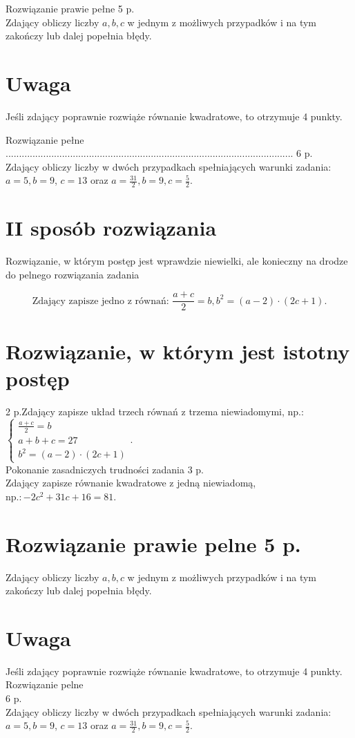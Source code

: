 \documentclass[10pt]{article}
\begin{document}
Rozwiązanie prawie pełne 5 p.\\
Zdający obliczy liczby $a, b, c$ w jednym z możliwych przypadków i na tym zakończy lub dalej popełnia błędy.

\section*{Uwaga}
Jeśli zdający poprawnie rozwiąże równanie kwadratowe, to otrzymuje 4 punkty.

Rozwiązanie pełne ........................................................................................................... 6 p.\\
Zdający obliczy liczby w dwóch przypadkach spełniających warunki zadania: $a=5, b=9$, $c=13$ oraz $a=\frac{31}{2}, b=9, c=\frac{5}{2}$.

\section*{II sposób rozwiązania}
Rozwiązanie, w którym postęp jest wprawdzie niewielki, ale konieczny na drodze do pelnego rozwiązania zadania

$$
\text { Zdający zapisze jedno z równań: } \frac{a+c}{2}=b, b^{2}=(a-2) \cdot(2 c+1) \text {. }
$$

\section*{Rozwiązanie, w którym jest istotny postęp}
 2 p.Zdający zapisze układ trzech równań z trzema niewiadomymi, np.: $\left\{\begin{array}{l}\frac{a+c}{2}=b \\ a+b+c=27 \\ b^{2}=(a-2) \cdot(2 c+1)\end{array}\right.$.\\
Pokonanie zasadniczych trudności zadania 3 p.\\
Zdający zapisze równanie kwadratowe z jedną niewiadomą, $\mathrm{np} .:-2 c^{2}+31 c+16=81$.

\section*{Rozwiązanie prawie pelne 5 p.}
Zdający obliczy liczby $a, b, c$ w jednym z możliwych przypadków i na tym zakończy lub dalej popełnia błędy.

\section*{Uwaga}
Jeśli zdający poprawnie rozwiąże równanie kwadratowe, to otrzymuje 4 punkty.\\
Rozwiązanie pelne\\
6 p.\\
Zdający obliczy liczby w dwóch przypadkach spełniających warunki zadania: $a=5, b=9$, $c=13$ oraz $a=\frac{31}{2}, b=9, c=\frac{5}{2}$.
\end{document}
